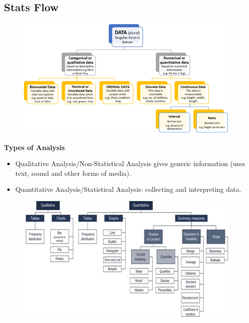 \documentclass{beamer}
\begin{document}
\subsection{Stats Flow} 
\begin{frame}
\begin{figure}
	\includegraphics[scale=0.4]{Data} 
\end{figure}
\end{frame}

\begin{frame}\textbf{Types of Analysis}
\begin{itemize}
\item Qualitative Analysis/Non-Statistical Analysis gives generic information (uses text, sound and other forms of media).
\item Quantitative Analysis/Statistical Analysis: collecting and interpreting data.

\end{itemize}
\begin{figure}
\includegraphics[scale=0.3]{QuantitativeQualitative} 
\end{figure}
\end{frame}
\end{document}
